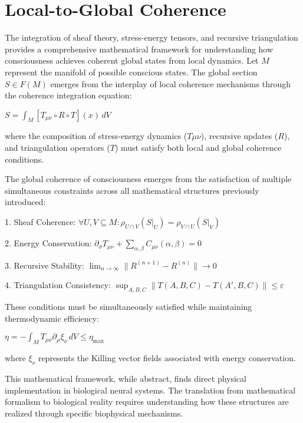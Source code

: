 \section{Local-to-Global Coherence}

The integration of sheaf theory, stress-energy tensors, and recursive triangulation provides a comprehensive mathematical framework for understanding how consciousness achieves coherent global states from local dynamics. Let $M$ represent the manifold of possible conscious states. The global section $S \in F(M)$ emerges from the interplay of local coherence mechanisms through the coherence integration equation:

$S = \int_M [T_{\mu\nu} \circ R \circ T](x) \,dV$

where the composition of stress-energy dynamics ($T\mu\nu$), recursive updates ($R$), and triangulation operators ($T$) must satisfy both local and global coherence conditions.

The global coherence of consciousness emerges from the satisfaction of multiple simultaneous constraints across all mathematical structures previously introduced:

1. Sheaf Coherence:
$\forall U,V \subseteq M: \rho_{U \cap V}(S|_U) = \rho_{V \cap U}(S|_V)$

2. Energy Conservation:
$\partial_\sigma T_{\mu\nu} + \sum_{\alpha,\beta} C_{\mu\nu}(\alpha,\beta) = 0$

3. Recursive Stability:
$\lim_{n \rightarrow \infty} \|R^{(n+1)} - R^{(n)}\| \rightarrow 0$

4. Triangulation Consistency:
$\sup_{A,B,C} \|T(A,B,C) - T(A',B,C)\| \leq \varepsilon$

These conditions must be simultaneously satisfied while maintaining thermodynamic efficiency:

$\eta = -\int_M T_{\mu\nu}\partial_\mu\xi_\nu \,dV \leq \eta_{\text{max}}$

where $\xi_\nu$ represents the Killing vector fields associated with energy conservation.

This mathematical framework, while abstract, finds direct physical implementation in biological neural systems. The translation from mathematical formalism to biological reality requires understanding how these structures are realized through specific biophysical mechanisms.

